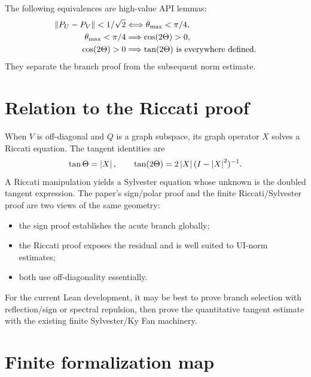 The following equivalences are high-value API lemmas:
\begin{align*}
 \left\lVert P_U-P_V\right\rVert<1/\sqrt2
 &\Longleftrightarrow
 \theta_{\max}<\pi/4,\\
 \theta_{\max}<\pi/4
 &\Longrightarrow
 \cos(2\Theta)>0,\\
 \cos(2\Theta)>0
 &\Longrightarrow
 \tan(2\Theta)\text{ is everywhere defined}.
\end{align*}
They separate the branch proof from the subsequent norm estimate.

\section{Relation to the Riccati proof}

When $V$ is off-diagonal and $Q$ is a graph subspace, its graph operator $X$ solves a Riccati equation. The tangent identities are
\[
 \tan\Theta=\left\lvert X\right\rvert,
 \qquad
 \tan(2\Theta)=2\left\lvert X\right\rvert(I-\left\lvert X\right\rvert^2)^{-1}.
\]
A Riccati manipulation yields a Sylvester equation whose unknown is the doubled tangent expression. The paper's sign/polar proof and the finite Riccati/Sylvester proof are two views of the same geometry:
\begin{itemize}[leftmargin=2em]
\item the sign proof establishes the acute branch globally;
\item the Riccati proof exposes the residual and is well suited to UI-norm estimates;
\item both use off-diagonality essentially.
\end{itemize}

For the current Lean development, it may be best to prove branch selection with reflection/sign or spectral repulsion, then prove the quantitative tangent estimate with the existing finite Sylvester/Ky Fan machinery.

\section{Finite formalization map}

